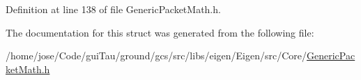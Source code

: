 Definition at line 138 of file Generic\-Packet\-Math.\-h.



The documentation for this struct was generated from the following file\-:\begin{DoxyCompactItemize}
\item 
/home/jose/\-Code/gui\-Tau/ground/gcs/src/libs/eigen/\-Eigen/src/\-Core/\hyperlink{_generic_packet_math_8h}{Generic\-Packet\-Math.\-h}\end{DoxyCompactItemize}
